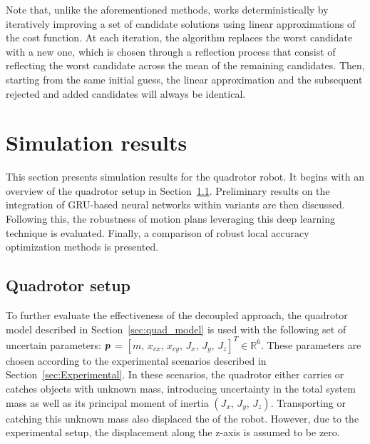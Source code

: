 Note that, unlike the aforementioned methods,  works deterministically by iteratively improving a set of candidate solutions using linear approximations of the cost function.
At each iteration, the algorithm replaces the worst candidate with a new one, which is chosen through a reflection process that consist of reflecting the worst candidate across the mean of the remaining candidates.
Then, starting from the same initial guess, the linear approximation and the subsequent rejected and added candidates will always be identical.

\section{Simulation results} \label{sec:SimuResults}

This section presents simulation results for the quadrotor robot. 
It begins with an overview of the quadrotor setup in Section~\ref{sec:quad_setup}. 
Preliminary results on the integration of GRU-based neural networks within  variants are then discussed. 
Following this, the robustness of motion plans leveraging this deep learning technique is evaluated. 
Finally, a comparison of robust local accuracy optimization methods is presented.

\subsection{Quadrotor setup} \label{sec:quad_setup}

To further evaluate the effectiveness of the decoupled approach, the quadrotor model described in Section~\ref{sec:quad_model} is used with the following set of uncertain parameters: $\boldsymbol{p}$ = $[m, \, x_{cx}, \, x_{cy}, \, J_{x}, \, J_{y}, \,J_{z}]^T \in \mathbb{R}^{6}$.
These parameters are chosen according to the experimental scenarios described in Section~\ref{sec:Experimental}.
In these scenarios, the quadrotor either carries or catches objects with unknown mass, introducing uncertainty in the total system mass as well as its principal moment of inertia $(J_{x}, \, J_{y}, \,J_{z})$.
Transporting or catching this unknown mass also displaced the  of the robot.
However, due to the experimental setup, the displacement along the z-axis is assumed to be zero.

